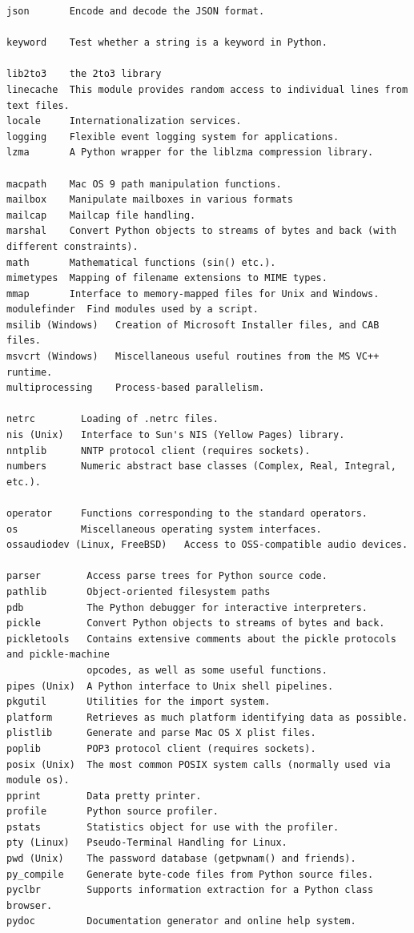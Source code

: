 \documentclass[9pt,a4wide]{extarticle}
\begin{document}
\begin{verbatim}
json       Encode and decode the JSON format.

keyword    Test whether a string is a keyword in Python.

lib2to3    the 2to3 library
linecache  This module provides random access to individual lines from text files.
locale     Internationalization services.
logging    Flexible event logging system for applications.
lzma       A Python wrapper for the liblzma compression library.

macpath    Mac OS 9 path manipulation functions.
mailbox    Manipulate mailboxes in various formats
mailcap    Mailcap file handling.
marshal    Convert Python objects to streams of bytes and back (with different constraints).
math       Mathematical functions (sin() etc.).
mimetypes  Mapping of filename extensions to MIME types.
mmap       Interface to memory-mapped files for Unix and Windows.
modulefinder  Find modules used by a script.
msilib (Windows)   Creation of Microsoft Installer files, and CAB files.
msvcrt (Windows)   Miscellaneous useful routines from the MS VC++ runtime.
multiprocessing    Process-based parallelism.

netrc        Loading of .netrc files.
nis (Unix)   Interface to Sun's NIS (Yellow Pages) library.
nntplib      NNTP protocol client (requires sockets).
numbers      Numeric abstract base classes (Complex, Real, Integral, etc.).          

operator     Functions corresponding to the standard operators.
os           Miscellaneous operating system interfaces.
ossaudiodev (Linux, FreeBSD)   Access to OSS-compatible audio devices.         

parser        Access parse trees for Python source code.
pathlib       Object-oriented filesystem paths
pdb           The Python debugger for interactive interpreters.
pickle        Convert Python objects to streams of bytes and back.
pickletools   Contains extensive comments about the pickle protocols and pickle-machine 
              opcodes, as well as some useful functions.
pipes (Unix)  A Python interface to Unix shell pipelines.
pkgutil       Utilities for the import system.
platform      Retrieves as much platform identifying data as possible.
plistlib      Generate and parse Mac OS X plist files.
poplib        POP3 protocol client (requires sockets).
posix (Unix)  The most common POSIX system calls (normally used via module os).
pprint        Data pretty printer.
profile       Python source profiler.
pstats        Statistics object for use with the profiler.
pty (Linux)   Pseudo-Terminal Handling for Linux.
pwd (Unix)    The password database (getpwnam() and friends).
py_compile    Generate byte-code files from Python source files.
pyclbr        Supports information extraction for a Python class browser.
pydoc         Documentation generator and online help system.                     
 

\end{verbatim}
\end{document}
